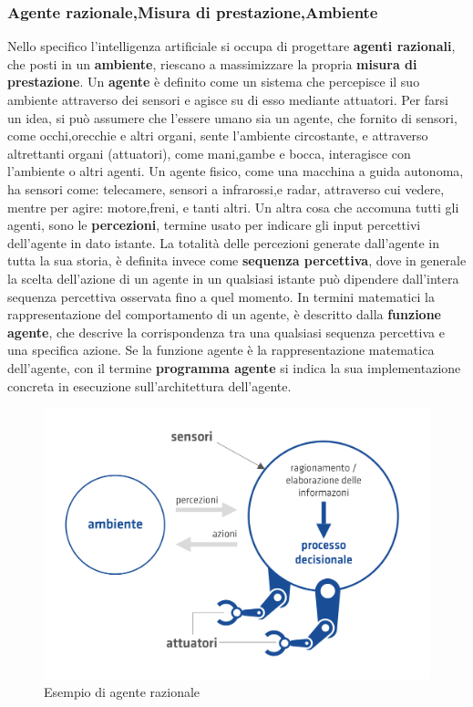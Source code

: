 \documentclass[14pt]{extarticle}
\begin{document}
\subsubsection{Agente razionale,Misura di prestazione,Ambiente}
Nello specifico l'intelligenza artificiale si occupa di progettare \textbf{agenti razionali}, che posti in un \textbf{ambiente}, riescano a massimizzare la propria \textbf{misura di prestazione}.\cite{russell2005intelligenza}
Un \textbf{agente} è definito  come un sistema che percepisce il suo ambiente attraverso dei sensori e agisce su di esso mediante attuatori. Per farsi un idea, si può assumere che l'essere umano sia un agente, che fornito di sensori, come occhi,orecchie e altri organi, sente l'ambiente circostante, e attraverso altrettanti organi (attuatori), come mani,gambe e bocca, interagisce con l'ambiente o altri agenti.
Un agente fisico, come una macchina a guida autonoma, ha sensori come: telecamere, sensori a infrarossi,e radar, attraverso cui vedere, mentre  per agire: motore,freni, e tanti altri. 
Un altra cosa che accomuna tutti gli agenti, sono le  \textbf{percezioni}, termine usato per indicare gli input percettivi dell'agente in dato istante.\cite{russell2005intelligenza}
La totalità delle percezioni generate dall'agente in tutta la sua storia, è definita invece come \textbf{sequenza percettiva}, dove in generale la scelta dell'azione di un agente in un qualsiasi istante può dipendere dall'intera sequenza percettiva osservata fino a quel momento.
In termini matematici la rappresentazione del comportamento di un agente, è descritto dalla \textbf{funzione agente}, che descrive la corrispondenza tra una qualsiasi sequenza percettiva e una specifica azione.
Se la funzione agente è la rappresentazione matematica dell'agente, con il termine \textbf{programma agente} si indica la sua implementazione concreta  in  esecuzione sull'architettura dell'agente.  \cite{russell2005intelligenza}
\begin{figure}
\centering
\includegraphics[scale=0.2]{AI_Agente_2.png}
\caption{Esempio di agente razionale}
\label{fig:agra}
\end{figure}
\end{document}
